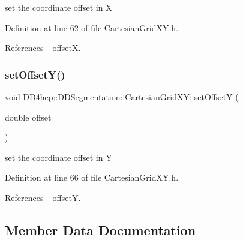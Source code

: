 set the coordinate offset in X 



Definition at line 62 of file Cartesian\+Grid\+X\+Y.\+h.



References \+\_\+offsetX.

\hypertarget{class_d_d4hep_1_1_d_d_segmentation_1_1_cartesian_grid_x_y_a0ce3cf2155283c1b45906709b37b07fc}{}\label{class_d_d4hep_1_1_d_d_segmentation_1_1_cartesian_grid_x_y_a0ce3cf2155283c1b45906709b37b07fc} 
\subsubsection{\texorpdfstring{set\+Offset\+Y()}{setOffsetY()}}
{\footnotesize\ttfamily void D\+D4hep\+::\+D\+D\+Segmentation\+::\+Cartesian\+Grid\+X\+Y\+::set\+OffsetY (\begin{DoxyParamCaption}\item[{double}]{offset }\end{DoxyParamCaption})\hspace{0.3cm}{\ttfamily [inline]}}



set the coordinate offset in Y 



Definition at line 66 of file Cartesian\+Grid\+X\+Y.\+h.



References \+\_\+offsetY.



\subsection{Member Data Documentation}
\hypertarget{class_d_d4hep_1_1_d_d_segmentation_1_1_cartesian_grid_x_y_a11329df4e58f1cb548bbd9f9f1108581}{}\label{class_d_d4hep_1_1_d_d_segmentation_1_1_cartesian_grid_x_y_a11329df4e58f1cb548bbd9f9f1108581} 
